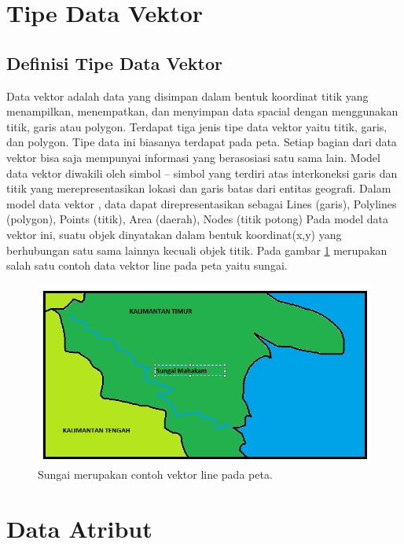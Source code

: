 \section{Tipe Data Vektor}
\subsection{Definisi Tipe Data Vektor}
Data vektor adalah data yang disimpan dalam bentuk koordinat titik yang menampilkan, 
menempatkan, dan menyimpan data spacial dengan menggunakan titik, garis atau polygon.
Terdapat tiga jenis tipe data vektor yaitu titik, garis, dan polygon. Tipe data ini 
biasanya terdapat pada peta. Setiap bagian dari data vektor bisa saja mempunyai 
informasi yang berasosiasi satu sama lain.
Model data vektor diwakili oleh simbol – simbol yang terdiri atas interkoneksi garis
dan titik yang merepresentasikan lokasi dan garis batas dari entitas geografi. Dalam
model data vektor , data dapat direpresentasikan sebagai Lines (garis), Polylines 
(polygon), Points (titik), Area (daerah), Nodes (titik potong) Pada model data vektor ini, 
suatu objek dinyatakan dalam bentuk koordinat(x,y) yang berhubungan satu sama lainnya kecuali objek titik. Pada gambar \ref{sungai} merupakan salah satu contoh data vektor line pada peta yaitu sungai.
\begin{figure}[ht]
	\centerline{\includegraphics[width=1\textwidth]{figures/sungai.PNG}}
	\caption{Sungai merupakan contoh vektor line pada peta.}
	\label{sungai}
	\end{figure}
   

\section{Data Atribut}
